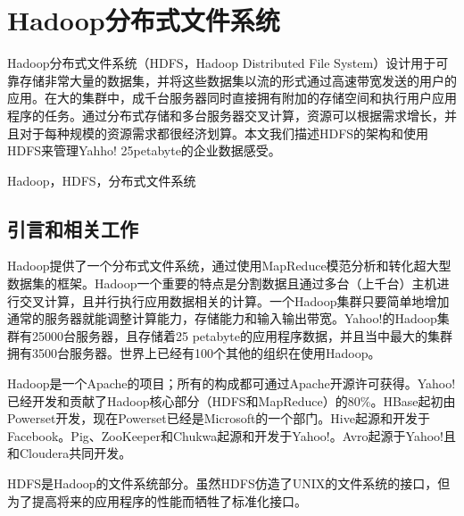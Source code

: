 \chapter{Hadoop分布式文件系统}

\ECUSTabstract Hadoop分布式文件系统（HDFS，Hadoop Distributed File System）设计用于可靠存储非常大量的数据集，并将这些数据集以流的形式通过高速带宽发送的用户的应用。在大的集群中，成千台服务器同时直接拥有附加的存储空间和执行用户应用程序的任务。通过分布式存储和多台服务器交叉计算，资源可以根据需求增长，并且对于每种规模的资源需求都很经济划算。本文我们描述HDFS的架构和使用HDFS来管理Yahho! 25petabyte的企业数据感受。

\ECUSTkeywords Hadoop，HDFS，分布式文件系统


\section{引言和相关工作}

Hadoop提供了一个分布式文件系统，通过使用MapReduce模范分析和转化超大型数据集的框架。Hadoop一个重要的特点是分割数据且通过多台（上千台）主机进行交叉计算，且并行执行应用数据相关的计算。一个Hadoop集群只要简单地增加通常的服务器就能调整计算能力，存储能力和输入输出带宽。Yahoo!的Hadoop集群有25000台服务器，且存储着25 petabyte的应用程序数据，并且当中最大的集群拥有3500台服务器。世界上已经有100个其他的组织在使用Hadoop。


Hadoop是一个Apache的项目；所有的构成都可通过Apache开源许可获得。Yahoo!已经开发和贡献了Hadoop核心部分（HDFS和MapReduce）的80\%。HBase起初由Powerset开发，现在Powerset已经是Microsoft的一个部门。Hive起源和开发于Facebook。Pig、ZooKeeper和Chukwa起源和开发于Yahoo!。Avro起源于Yahoo!且和Cloudera共同开发。

HDFS是Hadoop的文件系统部分。虽然HDFS仿造了UNIX的文件系统的接口，但为了提高将来的应用程序的性能而牺牲了标准化接口。

